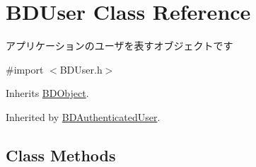 \hypertarget{interface_b_d_user}{\section{B\-D\-User Class Reference}
\label{interface_b_d_user}
}


アプリケーションのユーザを表すオブジェクトです  




{\ttfamily \#import $<$B\-D\-User.\-h$>$}



Inherits \hyperlink{interface_b_d_object}{B\-D\-Object}.



Inherited by \hyperlink{interface_b_d_authenticated_user}{B\-D\-Authenticated\-User}.

\subsection*{Class Methods}
